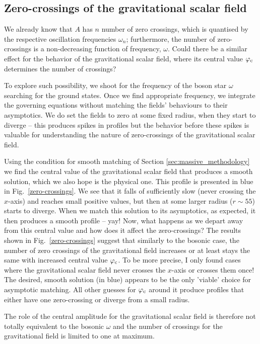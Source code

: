 \documentclass[12pt]{article}
\numberwithin{equation}{section}
\begin{document}
\subsection{Zero-crossings of the gravitational scalar field}
We already know that $A$ has $n$ number of zero crossings, which is quantised by the respective oscillation frequencies $\omega_n$; furthermore, the number of zero-crossings is a non-decreasing function of frequency, $\omega$. Could there be a similar effect for the behavior of the gravitational scalar field, where its central value $\varphi_{\rm c}$ determines the number of crossings?

To explore such possibility, we shoot for the frequency of the boson star $\omega$ searching for the ground states. Once we find appropriate frequency, we integrate the governing equations without matching the fields' behaviours to their asymptotics. We do set the fields to zero at some fixed radius, when they start to diverge -- this produces spikes in profiles but the behavior before these spikes is valuable for understanding the nature of zero-crossings of the gravitational scalar field.

Using the condition for smooth matching of Section \ref{sec:massive_methodology} we find the central value of the gravitational scalar field that produces a smooth solution, which we also hope is the physical one. This profile is presented in blue in Fig.~\ref{zero-crossings}. We see that it falls of sufficiently slow (never crossing the $x$-axis) and reaches small positive values, but then at some larger radius ($r \sim 55$) starts to diverge. When we match this solution to its asymptotics, as expected, it then produces a smooth profile -- yay! Now, what happens as we depart away from this central value and how does it affect the zero-crossings? The results shown in Fig.~\ref{zero-crossings} suggest that similarly to the bosonic case, the number of zero crossings of the gravitational field increases or at least stays the same with increased central value $\varphi_{\rm c}$. To be more precise, I only found cases where the gravitational scalar field never crosses the $x$-axis or crosses them once! The desired, smooth solution (in blue) appears to be the only 'viable' choice for asymptotic matching. All other guesses for $\varphi_{\rm c}$ around it produce profiles that either have one zero-crossing or diverge from a small radius.

The role of the central amplitude for the gravitational scalar field is therefore not totally equivalent to the bosonic $\omega$ and the number of crossings for the gravitational field is limited to one at maximum.
\end{document}

